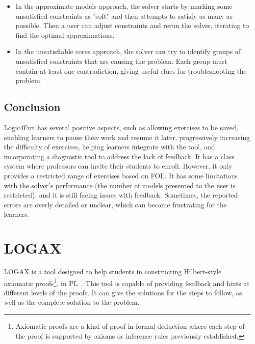 \begin{itemize}
    \item In the approximate models approach, the solver starts by marking some unsatisfied constraints as "soft" and then attempts to satisfy as many as possible. Then a user can adjust constraints and rerun the solver, iterating to find the optimal approximations.
    \item In the unsatisfiable cores approach, the solver can try to identify groups of unsatisfied constraints that are causing the problem. Each group must contain at least one contradiction, giving useful clues for troubleshooting the problem.
\end{itemize}

\subsection{Conclusion}

Logic4Fun has several positive aspects, such as allowing exercises to be saved, enabling learners to pause their work and resume it later, progressively increasing the difficulty of exercises, helping learners integrate with the tool, and incorporating a diagnostic tool to address the lack of feedback. It has a class system where professors can invite their students to enroll. However, it only provides a restricted range of exercises based on \gls{FOL}. It has some limitations with the solver's performance (the number of models presented to the user is restricted), and it is still facing issues with feedback. Sometimes, the reported errors are overly detailed or unclear, which can become frustrating for the learners.

\section{LOGAX}

LOGAX is a tool designed to help students in constructing Hilbert-style axiomatic proofs\footnote{Axiomatic proofs are a kind of proof in formal deduction where each step of the proof is supported by axioms or inference rules previously established.}. in \gls{PL}~\cite{lodder_2020_generation}. This tool is capable of providing feedback and hints at different levels of the proofs. It can give the solutions for the steps to follow, as well as the complete solution to the problem.

